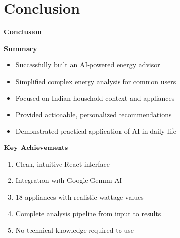\documentclass[11pt,aspectratio=169,notes,mathserif]{beamer}
\begin{document}
\section{Conclusion}
\begin{frame}{\textbf{Conclusion}}
    \justifying
    
    \begin{block}{\textbf{Summary}}
        \begin{itemize}
            \item Successfully built an AI-powered energy advisor
            \item Simplified complex energy analysis for common users
            \item Focused on Indian household context and appliances
            \item Provided actionable, personalized recommendations
            \item Demonstrated practical application of AI in daily life
        \end{itemize}
    \end{block}
    
    \begin{block}{\textbf{Key Achievements}}
        \begin{enumerate}
            \item Clean, intuitive React interface
            \item Integration with Google Gemini AI
            \item 18 appliances with realistic wattage values
            \item Complete analysis pipeline from input to results
            \item No technical knowledge required to use
        \end{enumerate}
    \end{block}
\end{frame}
\end{document}
